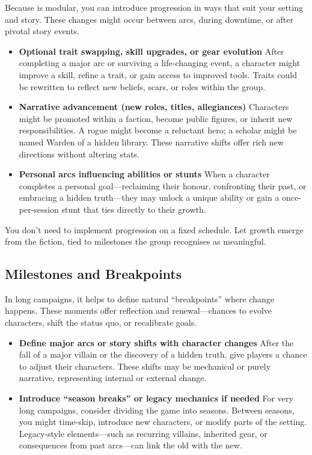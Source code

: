 Because \wyrd is modular, you can introduce progression in ways that suit your setting and story. These changes might occur between arcs, during downtime, or after pivotal story events.

\begin{itemize}
    \item \textbf{Optional trait swapping, skill upgrades, or gear evolution}  
    After completing a major arc or surviving a life-changing event, a character might improve a skill, refine a trait, or gain access to improved tools. Traits could be rewritten to reflect new beliefs, scars, or roles within the group.

    \item \textbf{Narrative advancement (new roles, titles, allegiances)}  
    Characters might be promoted within a faction, become public figures, or inherit new responsibilities. A rogue might become a reluctant hero; a scholar might be named Warden of a hidden library. These narrative shifts offer rich new directions without altering stats.

    \item \textbf{Personal arcs influencing abilities or stunts}  
    When a character completes a personal goal—reclaiming their honour, confronting their past, or embracing a hidden truth—they may unlock a unique ability or gain a once-per-session stunt that ties directly to their growth.
\end{itemize}

You don’t need to implement progression on a fixed schedule. Let growth emerge from the fiction, tied to milestones the group recognises as meaningful.

\subsection*{Milestones and Breakpoints}

In long campaigns, it helps to define natural “breakpoints” where change happens. These moments offer reflection and renewal—chances to evolve characters, shift the status quo, or recalibrate goals.

\begin{itemize}
    \item \textbf{Define major arcs or story shifts with character changes}  
    After the fall of a major villain or the discovery of a hidden truth, give players a chance to adjust their characters. These shifts may be mechanical or purely narrative, representing internal or external change.

    \item \textbf{Introduce “season breaks” or legacy mechanics if needed}  
    For very long campaigns, consider dividing the game into seasons. Between seasons, you might time-skip, introduce new characters, or modify parts of the setting. Legacy-style elements—such as recurring villains, inherited gear, or consequences from past arcs—can link the old with the new.
\end{itemize}


